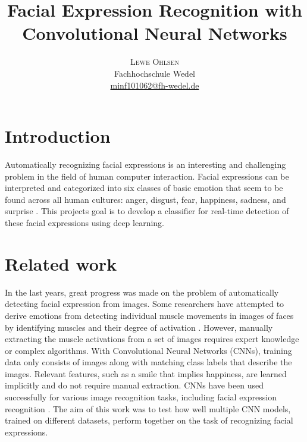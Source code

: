 \documentclass[twoside]{article}
\title{\vspace{-15mm}\fontsize{16pt}{10pt}\selectfont\textbf{Facial Expression Recognition with\\ Convolutional Neural Networks}} %
\author{
	\large
	\textsc{Lewe Ohlsen}\\[2mm] %
	\normalsize Fachhochschule Wedel \\ %
	\normalsize \href{mailto:minf101062@fh-wedel.de}{minf101062@fh-wedel.de} %
	\vspace{-5mm}
}
\date{}
\begin{document}
\maketitle %


\begin{multicols}{2} %

\section{Introduction}

Automatically recognizing facial expressions is an interesting and challenging problem in the field of human computer interaction. Facial expressions can be interpreted and categorized into six classes of basic emotion that seem to be found across all human cultures: anger, disgust, fear, happiness, sadness, and surprise \cite{ekman93}. This projects goal is to develop a classifier for real-time detection of these facial expressions using deep learning.


\section{Related work}
In the last years, great progress was made on the problem of automatically detecting facial expression from images. Some researchers have attempted to derive emotions from detecting individual muscle movements in images of faces by identifying muscles and their degree of activation \cite{lien98}. However, manually extracting the muscle activations from a set of images requires expert knowledge or complex algorithms. With Convolutional Neural Networks (CNNs), training data only consists of images along with matching class labels that describe the images. Relevant features, such as a smile that implies happiness, are learned implicitly and do not require manual extraction. CNNs have been used successfully for various image recognition tasks, including facial expression recognition \cite{dumas01}. The aim of this work was to test how well multiple CNN models, trained on different datasets, perform together on the task of recognizing facial expressions.


\end{multicols}
\end{document}
